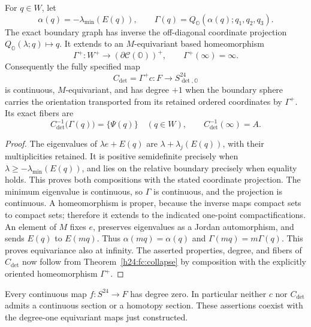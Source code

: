 \begin{corollary}
\label{h24:fc:boundary-composite}
For $q\in W$, let
\[
 \alpha(q)=-\lambda_{\min}(E(q)),\qquad
 \Gamma(q)=Q_{\mathbb O}(\alpha(q);q_1,q_2,q_3).
\]
The exact boundary graph has inverse the off-diagonal coordinate
projection $Q_{\mathbb O}(\lambda;q)\mapsto q$. It extends to an
$M$-equivariant based homeomorphism
\[
 \Gamma^+:W^+\longrightarrow
 (\partial\mathcal C(\mathbb O))^+,
 \qquad\Gamma^+(\infty)=\infty.
\]
Consequently the fully specified map
\begin{equation}
 C_{\det}=\Gamma^+c:F\longrightarrow
           S_{\det,\mathbb O}^{24}
 \label{h24:fc:determinant-collapse}
\end{equation}
is continuous, $M$-equivariant, and has degree $+1$ when the
boundary sphere carries the orientation transported from its
retained ordered coordinates by $\Gamma^+$. Its exact fibers are
\[
 C_{\det}^{-1}\bigl(\Gamma(q)\bigr)=\{\Psi(q)\}
 \quad(q\in W),\qquad C_{\det}^{-1}(\infty)=A.
\]
\end{corollary}

\begin{proof}
The eigenvalues of $\lambda e+E(q)$ are
$\lambda+\lambda_j(E(q))$, with their multiplicities retained.
It is positive semidefinite precisely when
$\lambda\ge-\lambda_{\min}(E(q))$, and lies on the relative
boundary precisely when equality holds. This proves both
compositions with the stated coordinate projection. The minimum
eigenvalue is continuous, so $\Gamma$ is continuous, and the
projection is continuous. A homeomorphism is proper, because the
inverse maps compact sets to compact sets; therefore it extends
to the indicated one-point compactifications.
An element of $M$ fixes $e$, preserves eigenvalues as a Jordan
automorphism, and sends $E(q)$ to $E(mq)$. Thus
$\alpha(mq)=\alpha(q)$ and $\Gamma(mq)=m\Gamma(q)$.
This proves equivariance also at infinity. The asserted
properties, degree, and fibers of $C_{\det}$ now follow from
Theorem~\ref{h24:fc:collapse} by composition with the explicitly
oriented homeomorphism $\Gamma^+$.
\end{proof}

\begin{corollary}
\label{h24:fc:no-reverse-degree}
Every continuous map $f:S^{24}\to F$ has degree zero.
In particular neither $c$ nor $C_{\det}$ admits a continuous
section or a homotopy section. These assertions coexist with
the degree-one equivariant maps just constructed.
\end{corollary}

